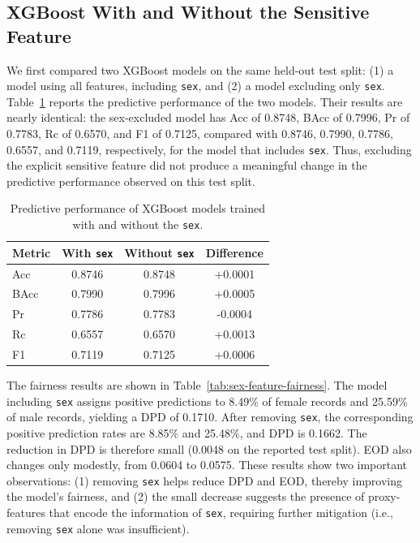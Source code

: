 \documentclass{article}
\begin{document}
\subsection{XGBoost With and Without the Sensitive Feature}

We first compared two XGBoost models on the same held-out test split: 
(1) a model using all features, including \texttt{sex}, and (2) a
model excluding only \texttt{sex}. Table~\ref{tab:sex-feature-performance} reports
the predictive performance of the two models. Their results are nearly
identical: the sex-excluded model has Acc of 0.8748, BAcc of
0.7996, Pr of 0.7783, Rc of 0.6570, and F1 of 0.7125, compared with
0.8746, 0.7990, 0.7786, 0.6557, and 0.7119, respectively, for the model that
includes \texttt{sex}. Thus, excluding the explicit sensitive feature did not
produce a meaningful change in the predictive performance observed on this
test split.

\begin{table}[t]
  \centering
  \footnotesize
  \caption{Predictive performance of XGBoost models trained with and without
  the \texttt{sex}.}
  \label{tab:sex-feature-performance}
  \begin{tabular}{lccc}
    \toprule
    Metric & With \texttt{sex} & Without \texttt{sex} & Difference \\
    \midrule
    Acc & 0.8746 & 0.8748 & +0.0001 \\
    BAcc & 0.7990 & 0.7996 & +0.0005 \\
    Pr & 0.7786 & 0.7783 & -0.0004 \\
    Rc & 0.6557 & 0.6570 & +0.0013 \\
    F1 & 0.7119 & 0.7125 & +0.0006 \\
    \bottomrule
  \end{tabular}
\end{table}

The fairness results are shown in Table~\ref{tab:sex-feature-fairness}. The
model including \texttt{sex} assigns positive predictions to 8.49\% of female
records and 25.59\% of male records, yielding a DPD of 0.1710. After removing
\texttt{sex}, the corresponding positive
prediction rates are 8.85\% and 25.48\%, and DPD is 0.1662. The reduction in
DPD is therefore small (0.0048 on the reported test split). EOD also changes
only modestly, from 0.0604 to 0.0575.
These results show two important observations: (1) removing \texttt{sex} helps
reduce DPD and EOD, thereby improving the model's fairness, and (2) the small
decrease suggests the presence of proxy-features that encode the information of \texttt{sex},
requiring further mitigation (i.e., removing \texttt{sex} alone was insufficient).
\end{document}
